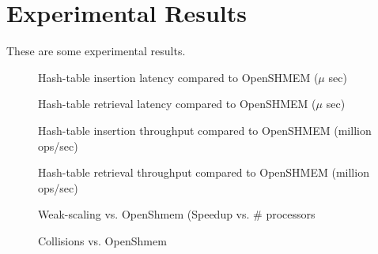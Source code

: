 \section{Experimental Results}

These are some experimental results. 

\begin{figure}[ht]
  \center
  \fbox{\rule{2.5in}{0pt}\rule[-2.5in]{0pt}{4ex}}  
  \caption{Hash-table insertion latency compared to OpenSHMEM ($\mu$ sec)}
  \label{fig:put-latency}
\end{figure}

\begin{figure}[ht]
  \center
  \fbox{\rule{2.5in}{0pt}\rule[-2.5in]{0pt}{4ex}}  
  \caption{Hash-table retrieval latency compared to OpenSHMEM ($\mu$ sec)}
  \label{fig:put-latency}
\end{figure}

\begin{figure}[ht]
  \center
  \fbox{\rule{2.5in}{0pt}\rule[-2.5in]{0pt}{4ex}}  
  \caption{Hash-table insertion throughput compared to OpenSHMEM
    (million ops/sec)}
  \label{fig:put-latency}
\end{figure}


\begin{figure}[ht]
  \center
  \fbox{\rule{2.5in}{0pt}\rule[-2.5in]{0pt}{4ex}}  
  \caption{Hash-table retrieval throughput compared to OpenSHMEM
    (million ops/sec)}
  \label{fig:put-latency}
\end{figure}

\begin{figure}[ht]
  \center
  \fbox{\rule{2.5in}{0pt}\rule[-2.5in]{0pt}{4ex}}  
  \caption{Weak-scaling vs. OpenShmem (Speedup vs. \# processors}
  \label{fig:put-latency}
\end{figure}

\begin{figure}[ht]
  \center
  \fbox{\rule{2.5in}{0pt}\rule[-2.5in]{0pt}{4ex}}  
  \caption{Collisions vs. OpenShmem }
  \label{fig:put-latency}
\end{figure}

